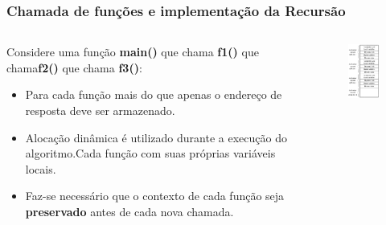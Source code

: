 \documentclass[10pt]{beamer}
\begin{document}
\begin{frame}
  \frametitle{Chamada de funções e implementação da Recursão}
  \begin{columns}[t]
    \begin{column}{6cm}
      Considere uma função \textbf{main()} que chama \textbf{f1()} que chama\textbf{f2()} que chama \textbf{f3()}:
      \begin{itemize}
        \item Para cada função mais do que apenas o endereço de resposta deve ser armazenado.
        \item Alocação dinâmica é utilizado durante a execução do algoritmo.Cada função com suas próprias variáveis locais.
        \item Faz-se necessário que o contexto de cada função seja \textbf{preservado} antes de cada nova chamada.
      \end{itemize}
    \end{column}
    \begin{column}{6cm}
      \begin{figure}[h]
        \begin{center}
          \includegraphics[width=4cm]{fig/img05}
        \end{center}
      \end{figure}
    \end{column}
  \end{columns}
\end{frame}
\end{document}
